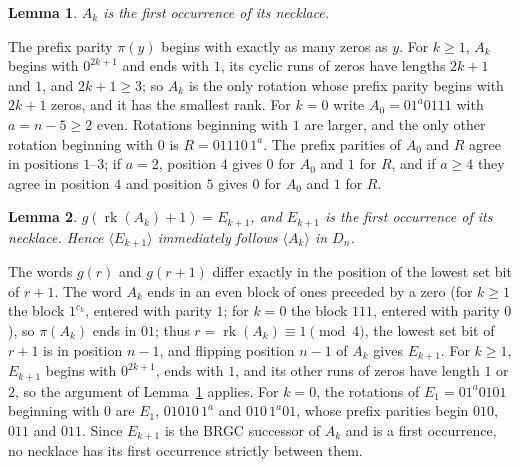 \documentclass[journal,onecolumn,11pt]{IEEEtran}
\newtheorem{lemma}{Lemma}
\newcommand{\rk}{\operatorname{rk}}
\begin{document}
\begin{lemma}\label{lem:first}
$A_k$ is the first occurrence of its necklace.
\end{lemma}
\begin{IEEEproof}
The prefix parity $\pi(y)$ begins with exactly as many zeros as $y$. For $k\ge1$, $A_k$ begins with $0^{2k+1}$ and
ends with $1$, its cyclic runs of zeros have lengths $2k+1$ and $1$, and $2k+1\ge3$; so $A_k$ is the only rotation
whose prefix parity begins with $2k+1$ zeros, and it has the smallest rank. For $k=0$ write $A_0=01^a0111$ with
$a=n-5\ge2$ even. Rotations beginning with $1$ are larger, and the only other rotation beginning with $0$ is
$R=01110\,1^a$. The prefix parities of $A_0$ and $R$ agree in positions $1$--$3$; if $a=2$, position $4$ gives $0$
for $A_0$ and $1$ for $R$, and if $a\ge4$ they agree in position $4$ and position $5$ gives $0$ for $A_0$ and $1$
for $R$.
\end{IEEEproof}

\begin{lemma}\label{lem:succ}
$g(\rk(A_k)+1)=E_{k+1}$, and $E_{k+1}$ is the first occurrence of its necklace. Hence $\langle E_{k+1}\rangle$
immediately follows $\langle A_k\rangle$ in $D_n$.
\end{lemma}
\begin{IEEEproof}
The words $g(r)$ and $g(r+1)$ differ exactly in the position of the lowest set bit of $r+1$. The word $A_k$ ends in
an even block of ones preceded by a zero (for $k\ge1$ the block $1^{c_k}$, entered with parity $1$; for $k=0$ the
block $111$, entered with parity $0$), so $\pi(A_k)$ ends in $01$; thus $r=\rk(A_k)\equiv1\pmod4$, the lowest set bit
of $r+1$ is in position $n-1$, and flipping position $n-1$ of $A_k$ gives $E_{k+1}$. For $k\ge1$, $E_{k+1}$ begins
with $0^{2k+1}$, ends with $1$, and its other runs of zeros have length $1$ or $2$, so the argument of
Lemma~\ref{lem:first} applies. For $k=0$, the rotations of $E_1=01^a0101$ beginning with $0$ are $E_1$, $01010\,1^a$
and $010\,1^a01$, whose prefix parities begin $010$, $011$ and $011$. Since $E_{k+1}$ is the BRGC successor of $A_k$
and is a first occurrence, no necklace has its first occurrence strictly between them.
\end{IEEEproof}
\end{document}
